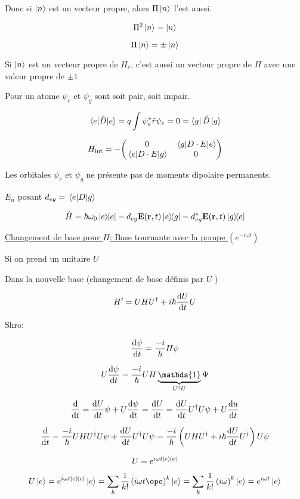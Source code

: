 Donc si $\ket{n}$ est un vecteur propre, alors $\Pi\ket{n}$ l'est aussi.  

$$\Pi^{2}\ket{n} =\ket{n}$$ 

$$\Pi \ket{n} = \pm \ket{n}$$ 

Si $\ket{n}$ est un vecteur propre de $H_e$, c'est aussi un vecteur propre de $\Pi$ avec une valeur propre de $\pm 1$   

\begin{tcolorbox}[title=]
	Pour un atome $\psi_e$ et $\psi_g$ sont soit pair, soit impair.   \centering
\end{tcolorbox}

$$\mel{e}{\hat D}{e} = q \int \psi_e^{*}\hat r \psi_e =0 = \bra{g} \hat D \ket{g}$$ 

$$H_{\text{int}} = -\mqty(0 & \mel{g}{D \cdot E}{e}\\ \mel{e}{D \cdot E}{g}& 0) $$ 

Les orbitales $\psi_e$ et $\psi_g$ ne présente pas de moments dipolaire permanents.  

$E_n$ posant $d_{eg} = \mel eDg$  

$$\hat H = \hbar \omega_0 \op e - d_{eg} \vb{E}(\vb{r},t) \op{e}{g} - d_{eg}^{*}\vb{E}(\vb{r},t) \op{g}{e}$$ 

\underline{Changement de base pour $H$: Base tournante avec la pompe $\left( e^{-i\omega t} \right) $  } 

Si on prend un unitaire $U$  

Dans la nouvelle base (changement de base définis par $U$ )

$$H' = UHU^{\dagger}+i\hbar \dv{U}{t} U$$ 


Shro:

$$\dv{\psi}{t} = \frac{-i}{\hbar} H\psi$$ 


$$U \dv{\psi}{t} = \frac{-i}{\hbar}  UH\underbrace{\mathds{1}}_{U^{\dagger}U} \Psi $$ 

$$\dv{{}}{t} (U\psi)  = \dv{U}{t} \psi + U \dv{\psi}{t} = \dv{U}{t} = \dv{U}{t} U^{\dagger}U \psi + U \dv{u}{t} $$ 

$$\dv{{}}{t} (U\psi) = \frac{-i}{\hbar} UHU^{\dagger}U\psi + \dv{U}{t} U^{\dagger}U \psi = \frac{-i}{\hbar} \left( U H U^{\dagger}+ i\hbar \dv{U}{t} U^\dagger \right) U \psi $$ 


$$U = e^{i\omega t \op e}$$ 

$$U \ket{e} = e^{i\omega t \op e} \ket{e}  = \sum_k \frac{1}{k!} \left( i\omega t \ope \right) ^k \ket{e} = \sum_k \frac{1}{k!} \left( i\omega \right) ^k \ket{e} = e^{i\omega t}\ket{e}$$ 


